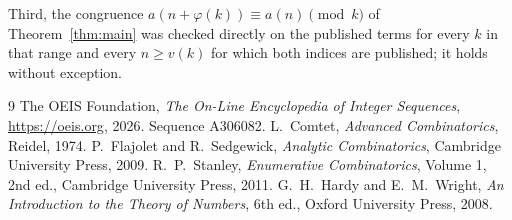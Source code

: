 \documentclass[11pt,a4paper]{article}
\theoremstyle{plain}
\theoremstyle{definition}
\begin{document}
Third, the congruence $a(n+\varphi(k))\equiv a(n)\pmod k$ of Theorem~\ref{thm:main} was
checked directly on the published terms for every $k$ in that range and every $n\ge v(k)$
for which both indices are published; it holds without exception.

\begin{thebibliography}{9}
 The OEIS Foundation, \emph{The On-Line Encyclopedia of Integer
Sequences}, \url{https://oeis.org}, 2026. Sequence A306082.
 L.~Comtet, \emph{Advanced Combinatorics}, Reidel, 1974.
 P.~Flajolet and R.~Sedgewick, \emph{Analytic Combinatorics}, Cambridge
University Press, 2009.
 R.~P.~Stanley, \emph{Enumerative Combinatorics}, Volume 1, 2nd ed.,
Cambridge University Press, 2011.
 G.~H.~Hardy and E.~M.~Wright, \emph{An Introduction to the Theory of
Numbers}, 6th ed., Oxford University Press, 2008.
\end{thebibliography}
\end{document}
